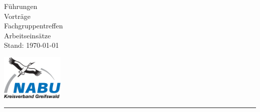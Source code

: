 \begin{center}
\vfill
\LARGE{\the\year
\vfill
Führungen\\
Vorträge\\
Fachgruppentreffen\\
Arbeitseinsätze\\}
\vfill
\footnotesize{Stand: \today}
\vfill
\end{center}
\setlength{\mylength}{.5\textwidth-15mm}
\hspace{\mylength}\includegraphics[width=30mm]{logos/NABU-cropped.pdf}\vspace{5mm}\\
\color{blue}\rule{\textwidth}{3mm}\color{black}
\restoregeometry